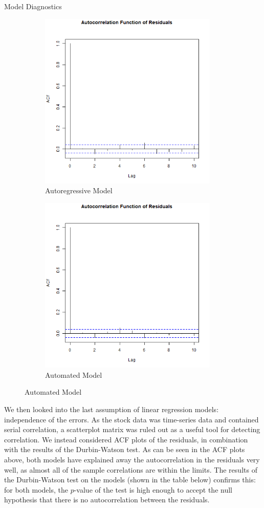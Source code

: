 \documentclass[]{article}
\begin{document}
\begin{section}{Model Diagnostics}
\begin{figure}[h]
\begin{subfigure}{.5\textwidth}
  \includegraphics[width=85mm]{diagnostics/arm_acf_residuals.png}
  \caption{Autoregressive Model}
\end{subfigure}%
\begin{subfigure}{.5\textwidth}
  \includegraphics[width=85mm]{diagnostics/fm_acf_residuals.png}
  \caption{Automated Model}
\end{subfigure}
\end{figure}

We then looked into the last assumption of linear regression models: independence of the errors. As the stock data was time-series data and contained serial correlation, a scatterplot matrix was ruled out as a useful tool for detecting correlation. We instead considered ACF plots of the residuals, in combination with the results of the Durbin-Watson test. As can be seen in the ACF plots above, both models have explained away the autocorrelation in the residuals very well, as almost all of the sample correlations are within the limits. The results of the Durbin-Watson test on the models (shown in the table below) confirms this: for both models, the $p$-value of the test is high enough to accept the null hypothesis that there is no autocorrelation between the residuals.





\end{section}
\end{document}
